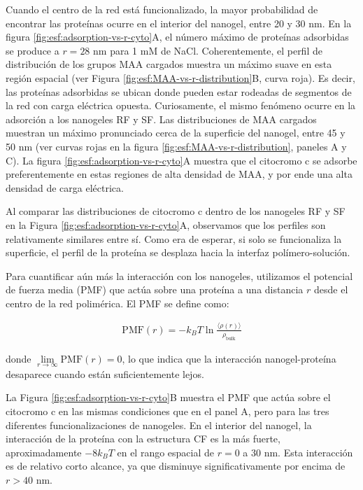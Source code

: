 Cuando el centro de la red est\'a funcionalizado, la mayor probabilidad de encontrar las prote\'inas ocurre en el interior del nanogel, entre 20 y 30 nm. En la figura \ref{fig:esf:adsorption-vs-r-cyto}A, el n\'umero m\'aximo de prote\'inas adsorbidas se produce a $r=28$ nm para 1 mM de NaCl. Coherentemente, el perfil de distribuci\'on de los grupos MAA cargados muestra un m\'aximo suave en esta regi\'on espacial (ver Figura \ref{fig:esf:MAA-vs-r-distribution}B, curva roja). Es decir, las prote\'inas adsorbidas se ubican donde pueden estar rodeadas de segmentos de la red con carga el\'ectrica opuesta. Curiosamente, el mismo fen\'omeno ocurre en la adsorci\'on a los nanogeles RF y SF. Las distribuciones de MAA cargados muestran un m\'aximo pronunciado cerca de la superficie del nanogel, entre 45 y 50 nm (ver curvas rojas en la figura \ref{fig:esf:MAA-vs-r-distribution}, paneles A y C). La figura \ref{fig:esf:adsorption-vs-r-cyto}A muestra que el citocromo c se adsorbe preferentemente en estas regiones de alta densidad de MAA, y por ende una alta densidad de carga el\'ectrica.



Al comparar las distribuciones de citocromo c dentro de los nanogeles RF y SF en la Figura \ref{fig:esf:adsorption-vs-r-cyto}A, observamos que los perfiles son relativamente similares entre s\'i. Como era de esperar, si solo se funcionaliza la superficie, el perfil de la prote\'ina se desplaza hacia la interfaz pol\'imero-soluci\'on.

Para cuantificar a\'un m\'as la interacci\'on con los nanogeles, utilizamos el potencial de fuerza media (PMF) que act\'ua sobre una prote\'ina a una distancia $r$ desde el centro de la red polim\'erica. El PMF se define como:

\begin{align}
	\text{PMF}(r) = -k_B T \ln \frac{\langle \rho(r)\rangle}{\rho_{\text{bulk}}}
\end{align}

donde $\lim\limits_{r\to \infty}\text{PMF}(r)=0$, lo que indica que la interacci\'on nanogel-prote\'ina desaparece cuando est\'an suficientemente lejos.

La Figura \ref{fig:esf:adsorption-vs-r-cyto}B muestra el PMF que act\'ua sobre el citocromo c en las mismas condiciones que en el panel A, pero para las tres diferentes funcionalizaciones de nanogeles. En el interior del nanogel, la interacci\'on de la prote\'ina con la estructura CF es la m\'as fuerte, aproximadamente $-8k_B T$ en el rango espacial de $r=0$ a 30 nm. Esta interacci\'on es de relativo corto alcance, ya que disminuye significativamente por encima de $r > 40$ nm.

